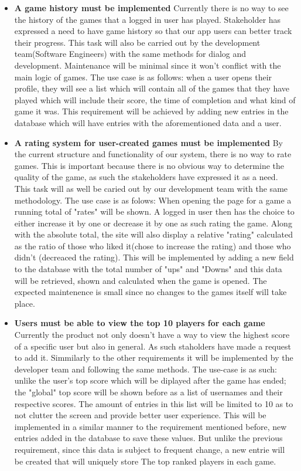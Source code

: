 \documentclass[]{VUMIFTemplateClass}
\begin{document}
\begin{itemize}
 \item \textbf{A game history must be implemented} Currently there is no way to see the history of the games that a logged in user has played. Stakeholder has expressed a need to have game history so that our app users can better track their progress. This task will also be carried out by the development team(Software Engineers) with the same methods for dialog and development. Maintenance will be minimal since it won't conflict with the main logic of games. The use case is as follows: when a user opens their profile, they will see a list which will contain all of the games that they have played which will include their score, the time of completion and what kind of game it was. This requirement will be achieved by adding new entries in the database which will have entries with the aforementioned data and a user.

 \item \textbf{A rating system for user-created games must be implemented} By the current structure and functionality of our system, there is no way to rate games. This is important because there is no obvious way to determine the quality of the game, as such the stakeholders have expressed it as a need. This task will as well be caried out by our development team with the same methodology. The use case is as folows: When opening the page for a game a running total of "rates" will be shown. A logged in user then has the choice to either increase it by one or decrease it by one as such rating the game. Along with the absolute total, the site will also display a relative "rating" calculated as the ratio of those who liked it(chose to increase the rating) and those who didn't (decreaced the rating). This will be implemented by adding a new field to the database with the total number of "ups" and "Downs" and this data will be retrieved, shown and calculated when the game is opened. The expected maintenence is small since no changes to the games itself will take place.

 \item \textbf{Users must be able to view the top 10 players for each game} Currently the product not only doesn't have a way to view the highest score of a specific user but also in general. As such staholders have made a request to add it. Simmilarly to the other requirements it will be implemented by the developer team and following the same methods. The use-case is as such: unlike the user's top score which will be diplayed after the game has ended; the "global" top score will be shown before as a list of usernames and their respective scores. The amount of entries in this list will be limited to 10 as to not clutter the screen and provide better user experience. This will be implemented in a similar manner to the requirement mentioned before, new entries added in the database to save these values. But unlike the previous requirement, since this data is subject to frequent change, a new entrie will be created that will uniquely store The top ranked players in each game.
\end{itemize}
\end{document}

